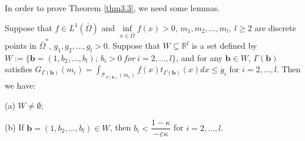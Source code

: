 \documentclass[a4paper,12pt,]{article}
\newtheorem{lemma}{\hskip\parindent\bf Lemma}[section]%
\numberwithin{equation}{section}
\numberwithin{equation}{section} \allowdisplaybreaks
\begin{document}
In order to prove Theorem \ref{thm3.3}, we need some lemmas.

\begin{lemma}
  Suppose that $f \in L^{1}(\bar{\Omega})$ and $\inf\limits_{x \in \bar{\Omega}}f(x)>0$, $m_{1},m_{2},\ldots, m_{l},~l \geq 2$ are discrete points in $\bar{\Omega}^{\ast}$, $g_{1}, g_{2}, \ldots, g_{l}>0$. Suppose that $W \subseteq \mathbb{R}^{l}$ is a set defined by $W := \{\mathbf{b} = (1,b_{2},\ldots, b_{l});~b_{i}>0 \ {for} \ i=2, \ldots, l\}$, and for any $\mathbf{b} \in W$, $\Gamma(\mathbf{b})$ satisfies $G_{\Gamma(\mathbf{b})}(m_{i}) = \displaystyle\int_{\mathcal{T}_{\Gamma(\mathbf{b})}(m_{i})}f(x)t_{\Gamma(\mathbf{b})}(x)dx \leq g_{i}$ for $i = 2,\ldots,l$. Then we have:
  
   (a) $W \neq \emptyset$;
  
   (b) If $\mathbf{b} = (1,b_{2}, \ldots, b_{l}) \in W$, then $b_{i}<\dfrac{1 - \kappa}{-\varepsilon \kappa}$ for $i=2, \ldots, l$.
  \label{lem3.8}
\end{lemma}
\end{document}
